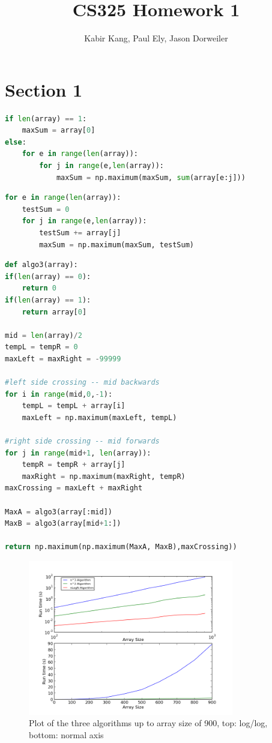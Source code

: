 \documentclass[a4paper,12pt]{article}
\title{CS325 Homework 1}
\author{Kabir Kang, Paul Ely, Jason Dorweiler}
\begin{document}
\maketitle

\section{Section 1}



  \begin{lstlisting}[language=python,caption={pseudo code for $n^3$ algorithm}]
if len(array) == 1:
	maxSum = array[0]
else:
	for e in range(len(array)):
		for j in range(e,len(array)):
			maxSum = np.maximum(maxSum, sum(array[e:j]))
  \end{lstlisting}
  
  \begin{lstlisting}[language=python,caption={pseudo code for $n^2$ algorithm}]
for e in range(len(array)):
	testSum = 0
	for j in range(e,len(array)):
		testSum += array[j]
		maxSum = np.maximum(maxSum, testSum)
  \end{lstlisting}

  \begin{lstlisting}[language=python,caption={pseudo code for $n\log(n)$ algorithm}]
def algo3(array):
if(len(array) == 0):
	return 0
if(len(array) == 1):
	return array[0]

mid = len(array)/2
tempL = tempR = 0
maxLeft = maxRight = -99999

#left side crossing -- mid backwards
for i in range(mid,0,-1):
	tempL = tempL + array[i]
	maxLeft = np.maximum(maxLeft, tempL)

#right side crossing -- mid forwards
for j in range(mid+1, len(array)):
	tempR = tempR + array[j]
	maxRight = np.maximum(maxRight, tempR)
maxCrossing = maxLeft + maxRight

MaxA = algo3(array[:mid])
MaxB = algo3(array[mid+1:])

return np.maximum(np.maximum(MaxA, MaxB),maxCrossing))
  \end{lstlisting}  


\begin{figure}[h!]
\centering
\includegraphics[width=0.8\textwidth]{plotTo900}
\caption{Plot of the three algorithms up to array size of 900, top: log/log, bottom: normal axis}
\end{figure} 
\end{document}
